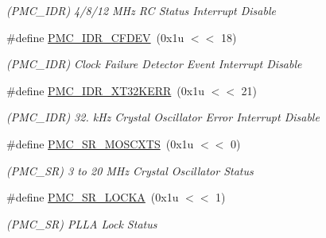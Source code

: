 \begin{DoxyCompactItemize}
\begin{DoxyCompactList}\small\item\em (P\+M\+C\+\_\+\+I\+DR) 4/8/12 M\+Hz RC Status Interrupt Disable \end{DoxyCompactList}\item 
\mbox{\label{group__SAME70__PMC_gad5c4de338e4ef9731b57b234acc8aec2}} 
\#define \mbox{\hyperlink{group__SAME70__PMC_gad5c4de338e4ef9731b57b234acc8aec2}{P\+M\+C\+\_\+\+I\+D\+R\+\_\+\+C\+F\+D\+EV}}~(0x1u $<$$<$ 18)
\begin{DoxyCompactList}\small\item\em (P\+M\+C\+\_\+\+I\+DR) Clock Failure Detector Event Interrupt Disable \end{DoxyCompactList}\item 
\mbox{\label{group__SAME70__PMC_gabc264dea503c055150f54375910cc7ce}} 
\#define \mbox{\hyperlink{group__SAME70__PMC_gabc264dea503c055150f54375910cc7ce}{P\+M\+C\+\_\+\+I\+D\+R\+\_\+\+X\+T32\+K\+E\+RR}}~(0x1u $<$$<$ 21)
\begin{DoxyCompactList}\small\item\em (P\+M\+C\+\_\+\+I\+DR) 32. k\+Hz Crystal Oscillator Error Interrupt Disable \end{DoxyCompactList}\item 
\mbox{\label{group__SAME70__PMC_ga8fc9ea4663e676dba2f1ce4025589743}} 
\#define \mbox{\hyperlink{group__SAME70__PMC_ga8fc9ea4663e676dba2f1ce4025589743}{P\+M\+C\+\_\+\+S\+R\+\_\+\+M\+O\+S\+C\+X\+TS}}~(0x1u $<$$<$ 0)
\begin{DoxyCompactList}\small\item\em (P\+M\+C\+\_\+\+SR) 3 to 20 M\+Hz Crystal Oscillator Status \end{DoxyCompactList}\item 
\mbox{\label{group__SAME70__PMC_ga67cebbfa3dfaf290083553d717b48101}} 
\#define \mbox{\hyperlink{group__SAME70__PMC_ga67cebbfa3dfaf290083553d717b48101}{P\+M\+C\+\_\+\+S\+R\+\_\+\+L\+O\+C\+KA}}~(0x1u $<$$<$ 1)
\begin{DoxyCompactList}\small\item\em (P\+M\+C\+\_\+\+SR) P\+L\+LA Lock Status \end{DoxyCompactList}\item 
\mbox{\label{group__SAME70__PMC_gae742c07d37e3011571a705ca768a5fee}} 

\end{DoxyCompactItemize}
